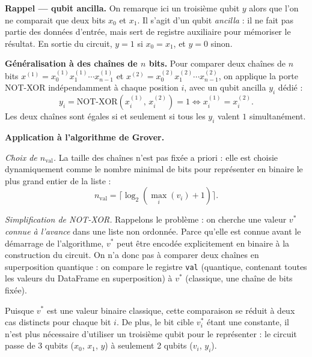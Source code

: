 \documentclass{ceri/sty/rapport}
\begin{document}
\medskip
\textbf{Rappel — qubit ancilla.}
On remarque ici un troisième qubit $y$ alors que l'on ne comparait que deux
bits $x_0$ et $x_1$. Il s'agit d'un qubit \emph{ancilla} : il ne fait pas
partie des données d'entrée, mais sert de registre auxiliaire pour mémoriser
le résultat. En sortie du circuit, $y = 1$ si $x_0 = x_1$, et $y = 0$ sinon.

\medskip
\textbf{Généralisation à des chaînes de $n$ bits.}
Pour comparer deux chaînes de $n$ bits
$x^{(1)} = x_0^{(1)} x_1^{(1)} \cdots x_{n-1}^{(1)}$ et
$x^{(2)} = x_0^{(2)} x_1^{(2)} \cdots x_{n-1}^{(2)}$,
on applique la porte NOT-XOR indépendamment à chaque position $i$, avec un
qubit ancilla $y_i$ dédié :
\[
  y_i = \text{NOT-XOR}\!\left(x_i^{(1)},\, x_i^{(2)}\right) = 1 \iff x_i^{(1)} = x_i^{(2)}.
\]
Les deux chaînes sont égales si et seulement si tous les $y_i$ valent $1$
simultanément.

\bigskip
\textbf{Application à l'algorithme de Grover.}

\medskip
\textit{Choix de $n_{\mathrm{val}}$.}
La taille des chaînes n'est pas fixée a priori : elle est choisie
dynamiquement comme le nombre minimal de bits pour représenter en binaire
le plus grand entier de la liste :
\[
  n_{\mathrm{val}} = \lceil \log_2(\max_i(v_i) + 1) \rceil.
\]

\medskip
\textit{Simplification de NOT-XOR.}
Rappelons le problème : on cherche une valeur $v^*$ \emph{connue à l'avance}
dans une liste non ordonnée. Parce qu'elle est connue avant le démarrage de
l'algorithme, $v^*$ peut être encodée explicitement en binaire à la
construction du circuit. On n'a donc pas à comparer deux chaînes en
superposition quantique : on compare le registre \texttt{val} (quantique,
contenant toutes les valeurs du DataFrame en superposition) à $v^*$ (classique,
une chaîne de bits fixée).

Puisque $v^*$ est une valeur binaire classique, cette comparaison se réduit
à deux cas distincts pour chaque bit $i$.
De plus, le bit cible $v^*_i$ étant une constante, il n'est plus nécessaire
d'utiliser un troisième qubit pour le représenter : le circuit passe de
3 qubits ($x_0$, $x_1$, $y$) à seulement 2 qubits ($v_i$, $y_i$).
\end{document}
